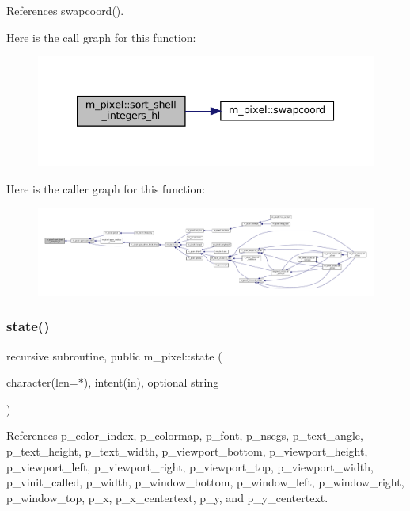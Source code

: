References swapcoord().

Here is the call graph for this function\+:
\nopagebreak
\begin{figure}[H]
\begin{center}
\leavevmode
\includegraphics[width=339pt]{namespacem__pixel_a4396c3ff36a080fbbfa859348203d0c7_cgraph}
\end{center}
\end{figure}
Here is the caller graph for this function\+:
\nopagebreak
\begin{figure}[H]
\begin{center}
\leavevmode
\includegraphics[width=350pt]{namespacem__pixel_a4396c3ff36a080fbbfa859348203d0c7_icgraph}
\end{center}
\end{figure}
\mbox{\label{namespacem__pixel_aa24c465b23b0ddda341e97bc206fe249}} 
\subsubsection{\texorpdfstring{state()}{state()}}
{\footnotesize\ttfamily recursive subroutine, public m\+\_\+pixel\+::state (\begin{DoxyParamCaption}\item[{character(len=$\ast$), intent(in), optional}]{string }\end{DoxyParamCaption})}



References p\+\_\+color\+\_\+index, p\+\_\+colormap, p\+\_\+font, p\+\_\+nsegs, p\+\_\+text\+\_\+angle, p\+\_\+text\+\_\+height, p\+\_\+text\+\_\+width, p\+\_\+viewport\+\_\+bottom, p\+\_\+viewport\+\_\+height, p\+\_\+viewport\+\_\+left, p\+\_\+viewport\+\_\+right, p\+\_\+viewport\+\_\+top, p\+\_\+viewport\+\_\+width, p\+\_\+vinit\+\_\+called, p\+\_\+width, p\+\_\+window\+\_\+bottom, p\+\_\+window\+\_\+left, p\+\_\+window\+\_\+right, p\+\_\+window\+\_\+top, p\+\_\+x, p\+\_\+x\+\_\+centertext, p\+\_\+y, and p\+\_\+y\+\_\+centertext.

